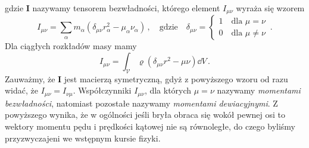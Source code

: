 \documentclass[../main.tex]{subfiles}
\begin{document}
gdzie \(\mathbf{I}\) nazywamy tensorem bezwładności, którego element \(I_{\mu\nu}\) wyraża się
wzorem
\begin{equation*}
    I_{\mu\nu}=\sum_\alpha m_\alpha\left(\delta_{\mu\nu}r_\alpha^2-\mu_\alpha\nu_\alpha\right)\,,\quad\text{gdzie}\quad \delta_{\mu\nu}=\begin{cases}1\quad\text{dla \(\mu=\nu\)}\\0\quad\text{dla \(\mu\neq\nu\)}\end{cases}\,.
\end{equation*}
Dla ciągłych rozkładów masy mamy
\begin{equation*}
    I_{\mu\nu}=\int_{\mathcal{V}}\varrho(\delta_{\mu\nu}r^2-\mu\nu)\dd{V}\,.
\end{equation*}
Zauważmy, że \(\mathbf{I}\) jest macierzą symetryczną, gdyż z powyższego wzoru od razu widać, że
\(I_{\mu\nu}=I_{\nu\mu}\). Współczynniki \(I_{\mu\nu}\), dla których \(\mu=\nu\) nazywamy
\textit{momentami bezwładności}, natomiast pozostałe nazywamy \textit{momentami dewiacyjnymi}. Z
powyższego wynika, że w ogólności jeśli bryła obraca się wokół pewnej osi to wektory momentu pędu i
prędkości kątowej nie są równoległe, do czego byliśmy przyzwyczajeni we wstępnym kursie fizyki.
\medskip
\end{document}
